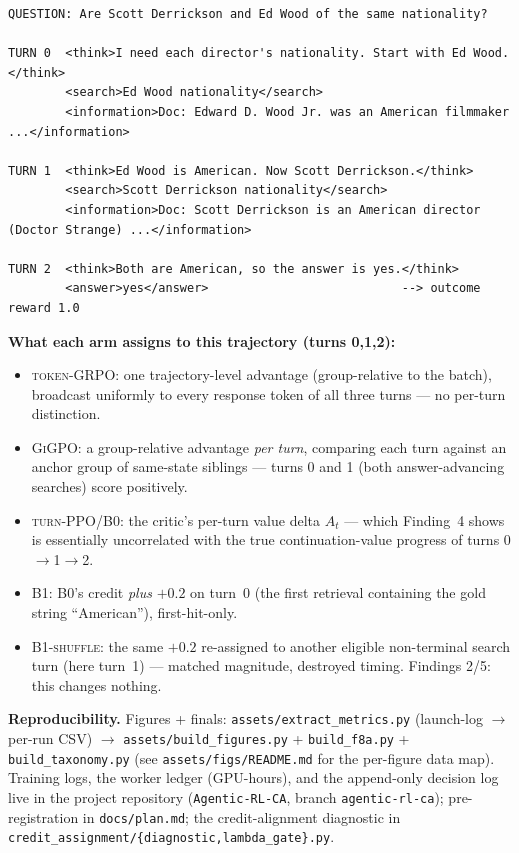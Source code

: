 \documentclass[11pt,a4paper]{article}
\newcommand{\arm}[1]{\textsc{#1}}
\begin{document}
\begin{Verbatim}[fontsize=\footnotesize,frame=single]
QUESTION: Are Scott Derrickson and Ed Wood of the same nationality?

TURN 0  <think>I need each director's nationality. Start with Ed Wood.</think>
        <search>Ed Wood nationality</search>
        <information>Doc: Edward D. Wood Jr. was an American filmmaker ...</information>

TURN 1  <think>Ed Wood is American. Now Scott Derrickson.</think>
        <search>Scott Derrickson nationality</search>
        <information>Doc: Scott Derrickson is an American director (Doctor Strange) ...</information>

TURN 2  <think>Both are American, so the answer is yes.</think>
        <answer>yes</answer>                           --> outcome reward 1.0
\end{Verbatim}

\noindent\textbf{What each arm assigns to this trajectory (turns 0,1,2):}
\begin{itemize}\itemsep1pt
  \item \arm{token-GRPO}: one trajectory-level advantage (group-relative to the batch), broadcast
  uniformly to every response token of all three turns --- no per-turn distinction.
  \item \arm{GiGPO}: a group-relative advantage \emph{per turn}, comparing each turn against an
  anchor group of same-state siblings --- turns 0 and 1 (both answer-advancing searches) score
  positively.
  \item \arm{turn-PPO/B0}: the critic's per-turn value delta $A_t$ --- which Finding~4 shows is
  essentially uncorrelated with the true continuation-value progress of turns 0$\to$1$\to$2.
  \item \arm{B1}: B0's credit \emph{plus} $+0.2$ on turn~0 (the first retrieval containing the
  gold string ``American''), first-hit-only.
  \item \arm{B1-shuffle}: the same $+0.2$ re-assigned to another eligible non-terminal search turn
  (here turn~1) --- matched magnitude, destroyed timing. Findings 2/5: this changes nothing.
\end{itemize}

\vspace{0.4em}
\noindent\textbf{Reproducibility.} Figures + finals: \texttt{assets/extract\_metrics.py}
(launch-log $\to$ per-run CSV) $\to$ \texttt{assets/build\_figures.py} +
\texttt{build\_f8a.py} + \texttt{build\_taxonomy.py} (see \texttt{assets/figs/README.md} for the
per-figure data map). Training logs, the worker ledger (GPU-hours), and the append-only decision
log live in the project repository (\texttt{Agentic-RL-CA}, branch \texttt{agentic-rl-ca});
pre-registration in \texttt{docs/plan.md}; the credit-alignment diagnostic in
\texttt{credit\_assignment/\{diagnostic,lambda\_gate\}.py}.
\end{document}
